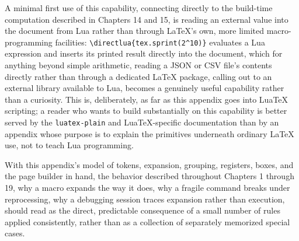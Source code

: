 A minimal first use of this capability, connecting directly to the build-time computation described in Chapters 14 and 15, is reading an external value into the document from Lua rather than through LaTeX's own, more limited macro-programming facilities: \texttt{\textbackslash{}directlua\{tex.sprint(2\^{}10)\}} evaluates a Lua expression and inserts its printed result directly into the document, which for anything beyond simple arithmetic, reading a JSON or CSV file's contents directly rather than through a dedicated LaTeX package, calling out to an external library available to Lua, becomes a genuinely useful capability rather than a curiosity. This is, deliberately, as far as this appendix goes into LuaTeX scripting; a reader who wants to build substantially on this capability is better served by the \texttt{luatex-plain} and LuaTeX-specific documentation than by an appendix whose purpose is to explain the primitives underneath ordinary LaTeX use, not to teach Lua programming.

With this appendix's model of tokens, expansion, grouping, registers, boxes, and the page builder in hand, the behavior described throughout Chapters 1 through 19, why a macro expands the way it does, why a fragile command breaks under reprocessing, why a debugging session traces expansion rather than execution, should read as the direct, predictable consequence of a small number of rules applied consistently, rather than as a collection of separately memorized special cases.

